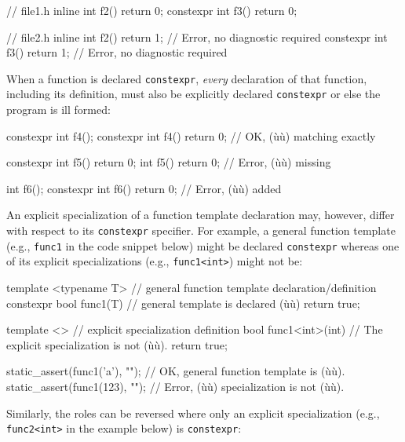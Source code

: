 \begin{emcppslisting}
// file1.h
          inline int f2() { return 0; }
       constexpr int f3() { return 0; }

// file2.h
          inline int f2() { return 1; }  // Error, no diagnostic required
       constexpr int f3() { return 1; }  // Error, no diagnostic required
\end{emcppslisting}


\noindent When a function is declared \lstinline!constexpr!, \emph{every} declaration
of that function, including its definition, must also be explicitly
declared \lstinline!constexpr! or else the program is ill formed:

\begin{emcppslisting}
constexpr int f4();
constexpr int f4() { return 0; }  // OK, (ù{}ù) matching exactly

constexpr int f5() { return 0; }
          int f5() { return 0; }  // Error, (ù{}ù) missing

          int f6();
constexpr int f6() { return 0; }  // Error, (ù{}ù) added
\end{emcppslisting}


\noindent An explicit specialization of a function template declaration may,
however, differ with respect to its \lstinline!constexpr! specifier. For
example, a general function template (e.g., \lstinline!func1! in the code
snippet below) might be declared \lstinline!constexpr! whereas one of its
explicit specializations (e.g., \lstinline!func1<int>!) might not be:

\begin{emcppslisting}
template <typename T>    // general function template declaration/definition
constexpr bool func1(T)  // general template is declared (ù{}ù)
{
    return true;
}

template <>              // explicit specialization definition
bool func1<int>(int)     // The explicit specialization is not (ù{}ù).
{
    return true;
}

static_assert(func1('a'), "");  // OK, general function template is (ù{}ù).
static_assert(func1(123), "");  // Error, (ù{}ù) specialization is not (ù{}ù).
\end{emcppslisting}


\noindent Similarly, the roles can be reversed where only an explicit
specialization (e.g., \lstinline!func2<int>! in the example below) is
\lstinline!constexpr!:

